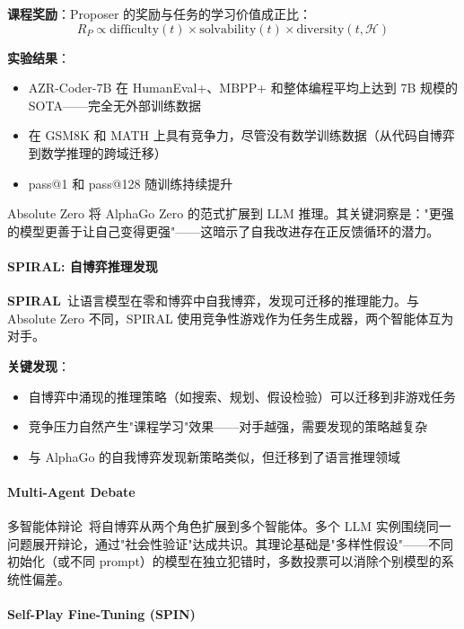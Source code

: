 \textbf{课程奖励}：Proposer 的奖励与任务的学习价值成正比：
\begin{equation}
R_P \propto \text{difficulty}(t) \times \text{solvability}(t) \times \text{diversity}(t, \mathcal{H})
\label{eq:az-curriculum}
\end{equation}

\textbf{实验结果}：
\begin{itemize}
\item AZR-Coder-7B 在 HumanEval+、MBPP+ 和整体编程平均上达到 7B 规模的 SOTA——完全无外部训练数据
\item 在 GSM8K 和 MATH 上具有竞争力，尽管没有数学训练数据（从代码自博弈到数学推理的跨域迁移）
\item pass@1 和 pass@128 随训练持续提升
\end{itemize}

Absolute Zero 将 AlphaGo Zero 的范式扩展到 LLM 推理。其关键洞察是："更强的模型更善于让自己变得更强"——这暗示了自我改进存在正反馈循环的潜力。

\paragraph{SPIRAL: 自博弈推理发现}

\textbf{SPIRAL}~\citep{spiral2024}让语言模型在零和博弈中自我博弈，发现可迁移的推理能力。与 Absolute Zero 不同，SPIRAL 使用竞争性游戏作为任务生成器，两个智能体互为对手。

\textbf{关键发现}：
\begin{itemize}
\item 自博弈中涌现的推理策略（如搜索、规划、假设检验）可以迁移到非游戏任务
\item 竞争压力自然产生"课程学习"效果——对手越强，需要发现的策略越复杂
\item 与 AlphaGo 的自我博弈发现新策略类似，但迁移到了语言推理领域
\end{itemize}

\paragraph{Multi-Agent Debate}

多智能体辩论~\citep{madd2023}将自博弈从两个角色扩展到多个智能体。多个 LLM 实例围绕同一问题展开辩论，通过"社会性验证"达成共识。其理论基础是"多样性假设"——不同初始化（或不同 prompt）的模型在独立犯错时，多数投票可以消除个别模型的系统性偏差。

\paragraph{Self-Play Fine-Tuning (SPIN)}

